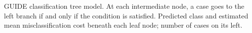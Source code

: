 \documentclass[12pt]{article}
\begin{document}
 \begin{center}
 \end{center}
GUIDE classification tree model.
At each intermediate node, a case goes to the left branch 
  if and only if the condition is satisfied.
Predicted class and estimated mean misclassification cost beneath each leaf node; number of cases on its left.
 
\end{document}
